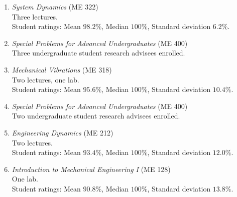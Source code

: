\begin{enumerate}[label={\arabic*.}]
	\item \textit{System Dynamics} (ME 322)  \\
	Three lectures. \\
	Student ratings: Mean $98.2\%$, Median $100\%$, Standard deviation $6.2\%$.
	\item \textit{Special Problems for Advanced Undergraduates} (ME 400)  \\
	Three undergraduate student research advisees enrolled.
\item \textit{Mechanical Vibrations} (ME 318)  \\
	Two lectures, one lab. \\
	Student ratings: Mean $95.6\%$, Median $100\%$, Standard deviation $10.4\%$.
	\item \textit{Special Problems for Advanced Undergraduates} (ME 400)  \\
	Two undergraduate student research advisees enrolled.
	\item \textit{Engineering Dynamics} (ME 212)  \\
	Two lectures. \\
	Student ratings: Mean $93.4\%$, Median $100\%$, Standard deviation $12.0\%$.
	\item \textit{Introduction to Mechanical Engineering I} (ME 128)  \\
	One lab. \\
	Student ratings: Mean $90.8\%$, Median $100\%$, Standard deviation $13.8\%$.
\end{enumerate}

\vspace*{\subsectionskip}

